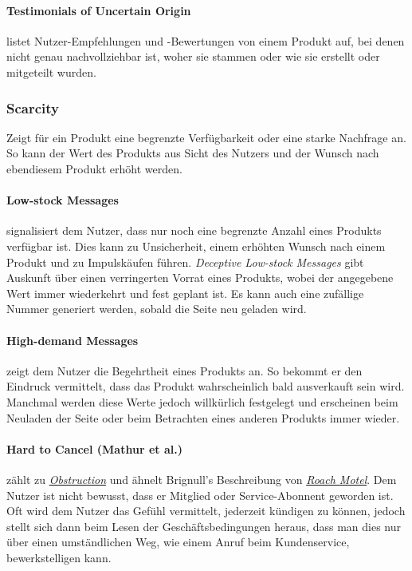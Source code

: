 \documentclass[a4paper]{article}
\begin{document}
\paragraph{Testimonials of Uncertain Origin}
\label{para:testimonials_of_uncertain_origin}
listet Nutzer-Empfehlungen und -Bewertungen von einem Produkt auf, bei denen nicht genau nachvollziehbar ist, woher sie stammen oder wie sie erstellt oder mitgeteilt wurden. 

\subsubsection{Scarcity}
\label{sssec:scarcity}
Zeigt für ein Produkt eine begrenzte Verfügbarkeit oder eine starke Nachfrage an. So kann der Wert des Produkts aus Sicht des Nutzers und der Wunsch nach ebendiesem Produkt erhöht werden.

\paragraph{Low-stock Messages}
\label{para:low_stock_messages}
signalisiert dem Nutzer, dass nur noch eine begrenzte Anzahl eines Produkts verfügbar ist. Dies kann zu Unsicherheit, einem erhöhten Wunsch nach einem Produkt und zu Impulskäufen führen. \textit{Deceptive Low-stock Messages} gibt Auskunft über einen verringerten Vorrat eines Produkts, wobei der angegebene Wert immer wiederkehrt und fest geplant ist. Es kann auch eine zufällige Nummer generiert werden, sobald die Seite neu geladen wird. 

\paragraph{High-demand Messages}
\label{para:high_demand_messages}
zeigt dem Nutzer die Begehrtheit eines Produkts an. So bekommt er den Eindruck vermittelt, dass das Produkt wahrscheinlich bald ausverkauft sein wird. Manchmal werden diese Werte jedoch willkürlich festgelegt und erscheinen beim Neuladen der Seite oder beim Betrachten eines anderen Produkts immer wieder.

\paragraph{Hard to Cancel (Mathur et al.)}
\label{para:hard_to_cancel}
zählt zu \hyperref[sssec:obstruction]{\textit{Obstruction}} und ähnelt Brignull's Beschreibung von \hyperref[para:roach_motel]{\textit{Roach Motel}}.\newline
Dem Nutzer ist nicht bewusst, dass er Mitglied oder Service-Abonnent geworden ist. Oft wird dem Nutzer das Gefühl vermittelt, jederzeit kündigen zu können, jedoch stellt sich dann beim Lesen der Geschäftsbedingungen heraus, dass man dies nur über einen umständlichen Weg, wie einem Anruf beim Kundenservice, bewerkstelligen kann. 
\end{document}
